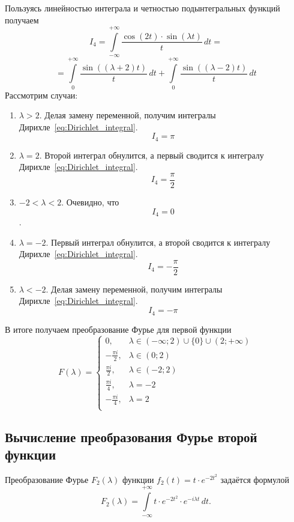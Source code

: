 \documentclass[a4paper, 11pt]{article}
\newcommand{\myint}[4]{\int\limits_{#1}^{#2}#3\,d#4}
\begin{document}
\begin{enumerate}
$$                $$
                Пользуясь линейностью интеграла и четностью подынтегральных функций получаем
                $$
                    I_4 = \myint{-\infty}{+\infty}{\frac{\cos(2t)\cdot \sin(\lambda t)}{t}} {t} =
                $$
                $$
                    = \myint{0}{+\infty}{\frac{\sin((\lambda+2)t)}{t}} {t} + \myint{0}{+\infty}{\frac{\sin((\lambda-2)t)}{t}} {t}
                $$
                Рассмотрим случаи:
                    \begin{enumerate}
                        \item $\lambda > 2$. Делая замену переменной, получим интегралы Дирихле~\eqref{eq:Dirichlet_integral}. $$I_4 = \pi$$
                        \item $\lambda = 2$. Второй интеграл обнулится, а первый сводится к интегралу Дирихле~\eqref{eq:Dirichlet_integral}. $$I_4 = \frac{\pi}{2}$$
                        \item $-2 < \lambda < 2 $. Очевидно, что $$I_4 = 0$$.
                        \item $\lambda = -2$. Первый интеграл обнулится, а второй сводится к интегралу Дирихле~\eqref{eq:Dirichlet_integral}. $$I_4 = -\frac{\pi}{2}$$
                        \item $\lambda < -2$. Делая замену переменной, получим интегралы Дирихле~\eqref{eq:Dirichlet_integral}. $$I_4 = -\pi$$
                    \end{enumerate}
        \end{enumerate}
        
        В итоге получаем преобразование Фурье для первой функции
        \begin{equation}
            F(\lambda) = 
            \begin{cases}
                0,                 & \lambda \in (-\infty ; 2)\cup \{ 0 \} \cup (2 ; +\infty) \\
                -\frac{\pi i}{2},  & \lambda \in (0 ; 2)\\
                \frac{\pi i}{2},   & \lambda \in (-2; 2) \\
                \frac{\pi i}{4},   & \lambda = -2 \\
                -\frac{\pi i}{4},  & \lambda = 2 \\
            \end{cases}
        \end{equation}
    
    \subsection{Вычисление преобразования Фурье второй функции}
        Преобразование Фурье $F_2(\lambda)$ функции $f_2(t) = t \cdot e^{-2t^2}$ задаётся формулой
        $$
            F_2(\lambda) = \myint{-\infty}{+\infty}{t \cdot e^{-2t^2} \cdot e^{-i\lambda  t}}{t}.
        $$
        
\end{document}
